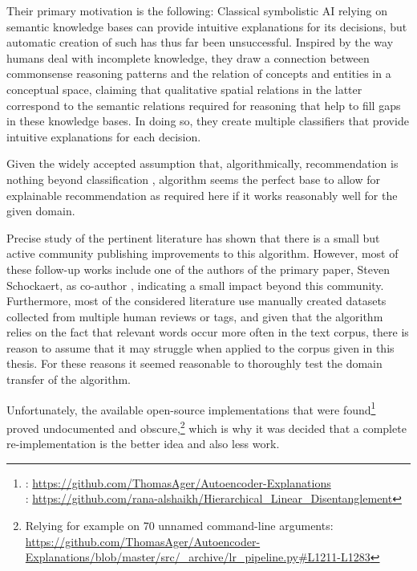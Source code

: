 Their primary motivation is the following: Classical symbolistic AI relying on semantic knowledge bases can provide intuitive explanations for its decisions, but automatic creation of such has thus far been unsuccessful. Inspired by the way humans deal with incomplete knowledge, they draw a connection between commonsense reasoning patterns and the relation of concepts and entities in a conceptual space, claiming that qualitative spatial relations in the latter correspond to the semantic relations required for reasoning that help to fill gaps in these knowledge bases. In doing so, they create multiple classifiers that provide intuitive explanations for each decision. 

Given the widely accepted assumption that, algorithmically, recommendation is nothing beyond classification \cite{Linden2003,Ai2018,Sarwar2000},  algorithm seems the perfect base to allow for explainable recommendation as required here if it works reasonably well for the given domain.

Precise study of the pertinent literature has shown that there is a small but active community publishing improvements to this algorithm. However, most of these follow-up works include one of the authors of the primary paper, Steven Schockaert, as co-author \cite{Ager2018,Alshaikh2020}, indicating a small impact beyond this community. Furthermore, most of the considered literature use manually created datasets collected from multiple human reviews or tags, and given that the algorithm relies on the fact that relevant words occur more often in the text corpus, there is reason to assume that it may struggle when applied to the corpus given in this thesis. For these reasons it seemed reasonable to thoroughly test the domain transfer of the algorithm.

Unfortunately, the available open-source implementations that were found\footnote{\cite{Ager2018}: \url{https://github.com/ThomasAger/Autoencoder-Explanations}\\ \indent {} \cite{Alshaikh2020}: \url{https://github.com/rana-alshaikh/Hierarchical_Linear_Disentanglement}} proved undocumented and obscure,\footnote{Relying for example on 70 unnamed command-line arguments: \url{https://github.com/ThomasAger/Autoencoder-Explanations/blob/master/src/_archive/lr_pipeline.py\#L1211-L1283}}
 which is why it was decided that a complete re-implementation is the better idea and also less work. 

